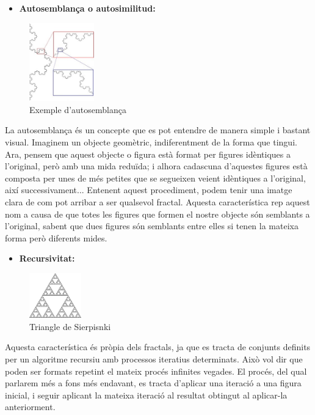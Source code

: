 \documentclass[12pt]{report}
\begin{document}
\begin{itemize}
\item \textbf{Autosemblança o autosimilitud:}
\end{itemize}

\begin{figure}
    \includegraphics [width=0.25\textwidth] {foto.jpg}
    \caption{Exemple d'autosemblança}
\end{figure}

La autosemblança és un concepte que es pot entendre de manera simple i bastant visual. Imaginem un objecte geomètric, indiferentment de la forma que tingui. Ara, pensem que aquest objecte o figura està format per figures idèntiques a l'original, però amb una mida reduïda; i alhora cadascuna d'aquestes figures està composta per unes de més petites que se segueixen veient idèntiques a l'original, així successivament... Entenent aquest procediment, podem tenir una imatge clara de com pot arribar a ser qualsevol fractal.
\newline
Aquesta característica rep aquest nom a causa de que totes les figures que formen el nostre objecte són semblants a l'original, sabent que dues figures són semblants entre elles si tenen la mateixa forma però diferents mides.
\newline
\newline
\newline
\begin{itemize}
\item \textbf{Recursivitat:}
\end{itemize}

\begin{figure}
    \includegraphics [width=0.2\textwidth] {recursivitat.png}
    \caption{Triangle de Sierpisnki}
\end{figure}
Aquesta característica és pròpia dels fractals, ja que es tracta de conjunts definits per un algoritme recursiu amb processos iteratius determinats. Això vol dir que poden ser formats repetint el mateix procés infinites vegades.
El procés, del qual parlarem més a fons més endavant, es tracta d'aplicar una iteració a una figura inicial, i seguir aplicant la mateixa iteració al resultat obtingut al aplicar-la anteriorment.
\newline
\end{document}
